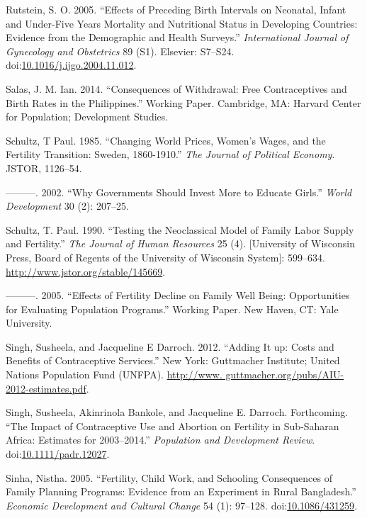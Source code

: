 \documentclass[]{article}
\begin{document}
\hypertarget{ref-Rutstein2005}{}
Rutstein, S. O. 2005. ``Effects of Preceding Birth Intervals on Neonatal, Infant and Under-Five Years Mortality and Nutritional Status in Developing Countries: Evidence from the Demographic and Health Surveys.'' \emph{International Journal of Gynecology and Obstetrics} 89 (S1). Elsevier: S7--S24. doi:\href{https://doi.org/10.1016/j.ijgo.2004.11.012}{10.1016/j.ijgo.2004.11.012}.

\hypertarget{ref-Salas2014}{}
Salas, J. M. Ian. 2014. ``Consequences of Withdrawal: Free Contraceptives and Birth Rates in the Philippines.'' Working Paper. Cambridge, MA: Harvard Center for Population; Development Studies.

\hypertarget{ref-Schultz1985}{}
Schultz, T Paul. 1985. ``Changing World Prices, Women's Wages, and the Fertility Transition: Sweden, 1860-1910.'' \emph{The Journal of Political Economy}. JSTOR, 1126--54.

\hypertarget{ref-schultz02}{}
---------. 2002. ``Why Governments Should Invest More to Educate Girls.'' \emph{World Development} 30 (2): 207--25.

\hypertarget{ref-Schultz1990}{}
Schultz, T. Paul. 1990. ``Testing the Neoclassical Model of Family Labor Supply and Fertility.'' \emph{The Journal of Human Resources} 25 (4). {[}University of Wisconsin Press, Board of Regents of the University of Wisconsin System{]}: 599--634. \url{http://www.jstor.org/stable/145669}.

\hypertarget{ref-Schultz2005}{}
---------. 2005. ``Effects of Fertility Decline on Family Well Being: Opportunities for Evaluating Population Programs.'' Working Paper. New Haven, CT: Yale University.

\hypertarget{ref-Singh2012}{}
Singh, Susheela, and Jacqueline E Darroch. 2012. ``Adding It up: Costs and Benefits of Contraceptive Services.'' New York: Guttmacher Institute; United Nations Population Fund (UNFPA). \href{http://www.\%20guttmacher.org/pubs/AIU-2012-estimates.pdf}{http://www. guttmacher.org/pubs/AIU-2012-estimates.pdf}.

\hypertarget{ref-Singh2017}{}
Singh, Susheela, Akinrinola Bankole, and Jacqueline E. Darroch. Forthcoming. ``The Impact of Contraceptive Use and Abortion on Fertility in Sub-Saharan Africa: Estimates for 2003--2014.'' \emph{Population and Development Review}. doi:\href{https://doi.org/10.1111/padr.12027}{10.1111/padr.12027}.

\hypertarget{ref-Sinha2005}{}
Sinha, Nistha. 2005. ``Fertility, Child Work, and Schooling Consequences of Family Planning Programs: Evidence from an Experiment in Rural Bangladesh.'' \emph{Economic Development and Cultural Change} 54 (1): 97--128. doi:\href{https://doi.org/10.1086/431259}{10.1086/431259}.
\end{document}
